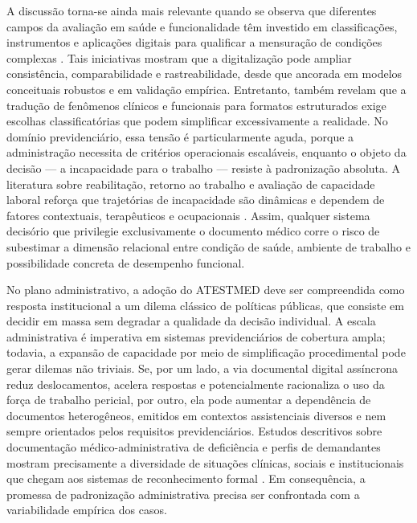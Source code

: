 \documentclass[12pt,a4paper]{article}
\begin{document}
A discussão torna-se ainda mais relevante quando se observa que diferentes campos da avaliação em saúde e funcionalidade têm investido em classificações, instrumentos e aplicações digitais para qualificar a mensuração de condições complexas \parencite{feudtner2014pediatriccomplexchronicconditionsclassificationsyst, guo2017assessmentofaphasiaacrosstheinternationalclassification}. Tais iniciativas mostram que a digitalização pode ampliar consistência, comparabilidade e rastreabilidade, desde que ancorada em modelos conceituais robustos e em validação empírica. Entretanto, também revelam que a tradução de fenômenos clínicos e funcionais para formatos estruturados exige escolhas classificatórias que podem simplificar excessivamente a realidade. No domínio previdenciário, essa tensão é particularmente aguda, porque a administração necessita de critérios operacionais escaláveis, enquanto o objeto da decisão — a incapacidade para o trabalho — resiste à padronização absoluta. A literatura sobre reabilitação, retorno ao trabalho e avaliação de capacidade laboral reforça que trajetórias de incapacidade são dinâmicas e dependem de fatores contextuais, terapêuticos e ocupacionais \parencite{przysada2019anassessmentofworkabilityafterthecompletionofre, deveau2011workplaceaccommodationandauditbasedevaluationprocess}. Assim, qualquer sistema decisório que privilegie exclusivamente o documento médico corre o risco de subestimar a dimensão relacional entre condição de saúde, ambiente de trabalho e possibilidade concreta de desempenho funcional.

No plano administrativo, a adoção do ATESTMED deve ser compreendida como resposta institucional a um dilema clássico de políticas públicas, que consiste em decidir em massa sem degradar a qualidade da decisão individual. A escala administrativa é imperativa em sistemas previdenciários de cobertura ampla; todavia, a expansão de capacidade por meio de simplificação procedimental pode gerar dilemas não triviais. Se, por um lado, a via documental digital assíncrona reduz deslocamentos, acelera respostas e potencialmente racionaliza o uso da força de trabalho pericial, por outro, ela pode aumentar a dependência de documentos heterogêneos, emitidos em contextos assistenciais diversos e nem sempre orientados pelos requisitos previdenciários. Estudos descritivos sobre documentação médico-administrativa de deficiência e perfis de demandantes mostram precisamente a diversidade de situações clínicas, sociais e institucionais que chegam aos sistemas de reconhecimento formal \parencite{sa2020medicalcertificateofdisabilityadescriptiveanalysisofav, hospital2016mentaldisabilityaretrospectivestudyofsocioclinica}. Em consequência, a promessa de padronização administrativa precisa ser confrontada com a variabilidade empírica dos casos.
\end{document}
